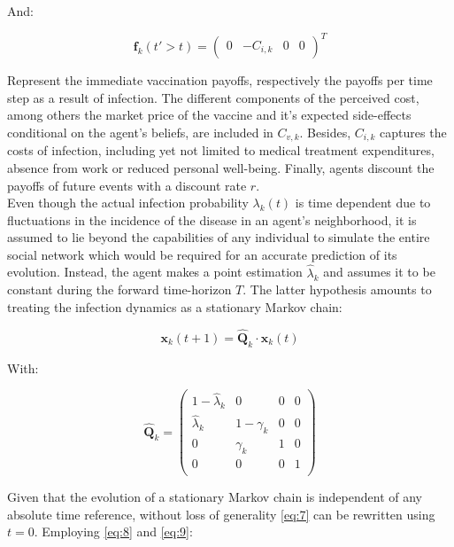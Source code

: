 \documentclass[11pt]{article}
\begin{document}
And:

\begin{equation}\label{eq:9}
\mathbf{f}_k(t' > t)=\left( \begin{array}{cccc} 0&-C_{i,k}&0&0 \end{array} \right)^T  
\end{equation}

Represent the immediate vaccination payoffs, respectively the payoffs per time step as a result of infection.  
The different components of the perceived cost, among others the market price of the vaccine and it's expected side-effects conditional on the agent's beliefs, are included in \(C_{v,k}\). Besides, \(C_{i,k}\) captures the costs of infection, including yet not limited to medical treatment expenditures, absence from work or reduced personal well-being. Finally, agents discount the payoffs of future events with a discount rate \(r\).\\
Even though the actual infection probability  \(\lambda_{k}(t)\) is time dependent due to fluctuations in the incidence of the disease in an agent's neighborhood, it is assumed to lie beyond the capabilities of any individual to simulate the entire social network which would be required for an accurate prediction of its evolution. Instead, the agent makes a point estimation \(\hat{\lambda}_{k}\) and assumes it to be constant during the forward time-horizon \(T\). The latter hypothesis amounts to treating the infection dynamics as a stationary Markov chain:

\begin{equation}\label{eq:10}
	 \mathbf{x}_k(t+1) = \hat{\mathbf{Q}}_k \cdot \mathbf{x}_k(t)
\end{equation}

With:

\begin{equation}\label{eq:11}
	 \hat{\mathbf{Q}}_k = 
	 \left (\begin{array}{cccc} 1-\hat{\lambda}_{k}&0&0&0 \\
	 	\hat{\lambda}_{k}&1-\gamma_{k}&0&0 \\
		0&\gamma_{k}&1&0 \\
		0&0&0&1 \\
	  \end{array} \right)
\end{equation}

Given that the evolution of a stationary Markov chain is independent of any absolute time reference, without loss of generality \eqref{eq:7} can be rewritten using $t = 0$. Employing \eqref{eq:8} and \eqref{eq:9}:
\end{document}
